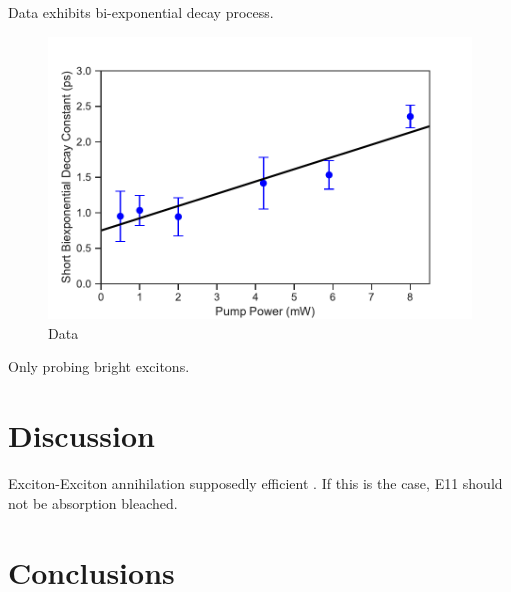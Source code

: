 Data exhibits bi-exponential decay process.

\begin{figure}[H]
	\centering
	\includegraphics[scale=0.8]{images/chapter_my_data/shorter_biexpconst_fit}
	\caption{Data}
\end{figure}

Only probing bright excitons. 

\section{Discussion}
Exciton-Exciton annihilation supposedly efficient \cite{murakami2009existence}. If this is the case, E11 should not be absorption bleached. 


\section{Conclusions}